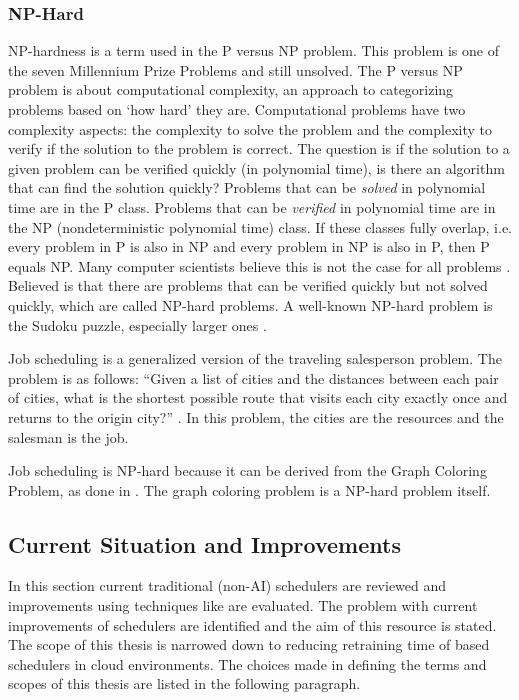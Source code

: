 \subsubsection{NP-Hard}

NP-hardness is a term used in the P versus NP problem. This problem is one of
the seven Millennium Prize Problems \cite{carlson2006} and still unsolved. The
P versus NP problem is about computational complexity, an approach to
categorizing problems based on `how hard' they are. Computational problems
have two complexity aspects: the complexity to solve the problem and the
complexity to verify if the solution to the problem is correct. The question
is if the solution to a given problem can be verified quickly (in polynomial
time), is there an algorithm that can find the solution quickly? Problems that
can be \emph{solved} in polynomial time are in the P class. Problems that can
be \emph{verified} in polynomial time are in the NP (nondeterministic
polynomial time) class. If these classes fully overlap, i.e. every problem in
P is also in NP and every problem in NP is also in P, then P equals NP. Many
computer scientists believe this is not the case for all problems
\cite{rosenberger2012}. Believed is that there are problems that can be
verified quickly but not solved quickly, which are called NP-hard problems. A
well-known NP-hard problem is the Sudoku puzzle, especially larger ones
\cite{yato2003}.

Job scheduling is a generalized version of the traveling salesperson problem.
The problem is as follows: ``Given a list of cities and the distances between
each pair of cities, what is the shortest possible route that visits each city
exactly once and returns to the origin city?'' \cite{flood1956}. In this
problem, the cities are the resources and the salesman is the job.

Job scheduling is NP-hard because it can be derived from the Graph Coloring
Problem, as done in . The graph coloring problem is a NP-hard
problem itself.

\subsection{Current Situation and Improvements}\label{sec:situ}

In this section current traditional (non-AI) schedulers are reviewed and
improvements using \ai techniques like \rl are
evaluated. The problem with current \ai improvements of schedulers are
identified and the aim of this resource is stated. The scope of this thesis is
narrowed down to reducing retraining time of \rl based schedulers in cloud
environments. The choices made in defining the terms and scopes of this thesis
are listed in the following paragraph.

